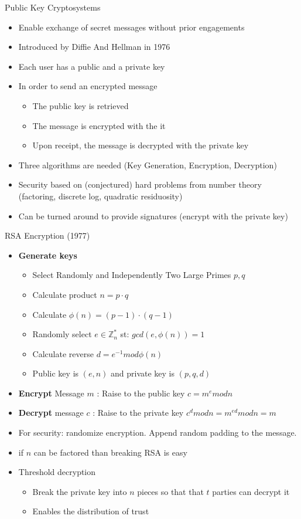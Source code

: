 \documentclass{beamer}
\begin{document}
\begin{frame}{Public Key Cryptosystems}
\begin{itemize}
\item Enable exchange of secret messages without prior engagements
\item Introduced by Diffie And Hellman in 1976
\item Each user has a public and a private key
\item In order to send an encrypted message
\begin{itemize}
\item The public key is retrieved
\item The message is encrypted with the it
\item Upon receipt, the message is decrypted with the private key
\end{itemize}
\item Three algorithms are needed (Key Generation, Encryption, Decryption)
\item Security based on (conjectured) hard problems from number theory (factoring, discrete log, quadratic residuosity)
\item Can be turned around to provide signatures (encrypt with the private key)
\end{itemize}
\end{frame}

\begin{frame}[allowframebreaks]{RSA Encryption (1977)}
\begin{itemize}
\item \textbf{Generate keys}
\begin{itemize}
\item  Select Randomly and Independently Two Large Primes $p,q$
\item  Calculate product $n = p \cdot q$
\item  Calculate $ \phi(n) = (p-1) \cdot (q-1)$
\item  Randomly select $ e \in \mathbb{Z}_{n}^{*}$ st: $gcd(e,\phi(n))=1$
\item  Calculate reverse $d = e^{-1} mod \phi(n)$ 
\item  Public key is $(e,n)$ and private key is $(p,q,d)$
\end{itemize}
\item \textbf{Encrypt} Message $m$ : Raise to the public key $c = m^e mod n$
\item \textbf{Decrypt} message $c$ : Raise to the private key $c^d mod n = m^{ed} mod n = m$
\item For security: randomize encryption. Append random padding to the message.
\item if $n$ can be factored than breaking RSA is easy

\item Threshold decryption
\begin{itemize}
\item Break the private key into $n$ pieces so that that $t$ parties can decrypt it
\item Enables the distribution of trust
\end{itemize}

\end{itemize}
\end{frame}
\end{document}
